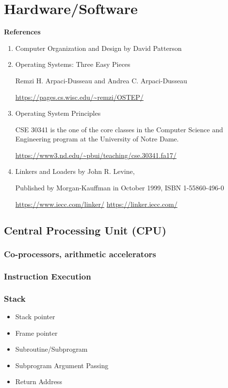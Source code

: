 \documentclass[12pt,a4paper]{article}
\begin{document}
\section{Hardware/Software}

\textbf{References}

\begin{enumerate}
\item Computer Organization and Design by David Patterson
\item Operating Systems: Three Easy Pieces

    Remzi H. Arpaci-Dusseau and Andrea C. Arpaci-Dusseau

    \url{https://pages.cs.wisc.edu/~remzi/OSTEP/}

\item Operating System Principles

    CSE 30341 is the one of the core classes in the Computer Science and 
    Engineering program at the University of Notre Dame.

    \url{https://www3.nd.edu/~pbui/teaching/cse.30341.fa17/}

\item Linkers and Loaders by John R. Levine,

    Published by Morgan-Kauffman in October 1999, ISBN 1-55860-496-0

    \url{https://www.iecc.com/linker/}
    \url{https://linker.iecc.com/}

\end{enumerate}

\subsection{Central Processing Unit (CPU)}

\subsubsection{Co-processors, arithmetic accelerators}

\subsubsection{Instruction Execution}

\subsubsection{Stack}

\begin{itemize}
\item Stack pointer
\item Frame pointer
\item Subroutine/Subprogram
\item Subprogram Argument Passing
\item Return Address
\end{itemize}
\end{document}
